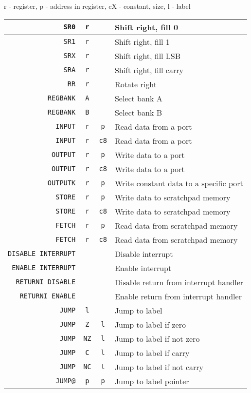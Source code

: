 \begin{table}[H]
\centering
r - register, p - address in register, cX - constant, size, l - label
\begin{tabular}{| r | c | c | l |}\hline
\verb|SR0|&\verb|r|&\verb||& Shift right, fill 0 \\ \hline
\verb|SR1|&\verb|r|&\verb||& Shift right, fill 1 \\ \hline
\verb|SRX|&\verb|r|&\verb||& Shift right, fill LSB \\ \hline
\verb|SRA|&\verb|r|&\verb||& Shift right, fill carry \\ \hline
\verb|RR|&\verb|r|&\verb||& Rotate right \\ \hline

\verb|REGBANK|&\verb|A|&\verb||& Select bank A \\ \hline
\verb|REGBANK|&\verb|B|&\verb||& Select bank B \\ \hline

\verb|INPUT|&\verb|r|&\verb|p|& Read data from a port \\ \hline
\verb|INPUT|&\verb|r|&\verb|c8|& Read data from a port \\ \hline
\verb|OUTPUT|&\verb|r|&\verb|p|& Write data to a port \\ \hline
\verb|OUTPUT|&\verb|r|&\verb|c8|& Write data to a port \\ \hline
\verb|OUTPUTK|&\verb|r|&\verb|p|& Write constant data to a specific port\\ \hline

\verb|STORE|&\verb|r|&\verb|p|& Write data to scratchpad memory \\ \hline
\verb|STORE|&\verb|r|&\verb|c8|& Write data to scratchpad memory \\ \hline
\verb|FETCH|&\verb|r|&\verb|p|& Read data from scratchpad memory \\ \hline
\verb|FETCH|&\verb|r|&\verb|c8|& Read data from scratchpad memory \\ \hline

\verb|DISABLE INTERRUPT|&\verb||&\verb||& Disable interrupt \\ \hline
\verb|ENABLE INTERRUPT|&\verb||&\verb||& Enable interrupt \\ \hline
\verb|RETURNI DISABLE|&\verb||&\verb||& Disable return from interrupt handler \\ \hline
\verb|RETURNI ENABLE|&\verb||&\verb||& Enable return from interrupt handler \\ \hline

\verb|JUMP|&\verb|l|&\verb||& Jump to label \\ \hline
\verb|JUMP|&\verb|Z|&\verb|l|& Jump to label if zero \\ \hline
\verb|JUMP|&\verb|NZ|&\verb|l|& Jump to label if not zero \\ \hline
\verb|JUMP|&\verb|C|&\verb|l|& Jump to label if carry \\ \hline
\verb|JUMP|&\verb|NC|&\verb|l|& Jump to label if not carry \\ \hline
\verb|JUMP@|&\verb|p|&\verb|p|& Jump to label pointer\\ \hline


\end{tabular}
\end{table}
